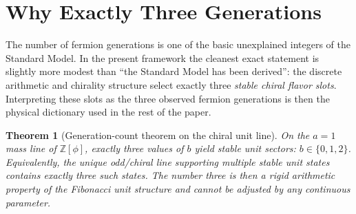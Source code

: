 \documentclass[12pt,a4paper]{article}
\newtheorem{theorem}{Theorem}
\theoremstyle{definition}
\begin{document}

\section{Why Exactly Three Generations}
\label{sec:generations}

The number of fermion generations is one of the basic unexplained integers of the Standard Model.  In the present framework the cleanest exact statement is slightly more modest than ``the Standard Model has been derived'': the discrete arithmetic and chirality structure select exactly three \emph{stable chiral flavor slots}.  Interpreting these slots as the three observed fermion generations is then the physical dictionary used in the rest of the paper.

\begin{theorem}[Generation-count theorem on the chiral unit line]
On the $a = 1$ mass line of $\mathbb{Z}[\phi]$, exactly three values of $b$ yield stable unit sectors: $b \in \{0, 1, 2\}$.  Equivalently, the unique odd/chiral line supporting multiple stable unit states contains exactly three such states.  The number three is then a rigid arithmetic property of the Fibonacci unit structure and cannot be adjusted by any continuous parameter.
\end{theorem}
\end{document}
